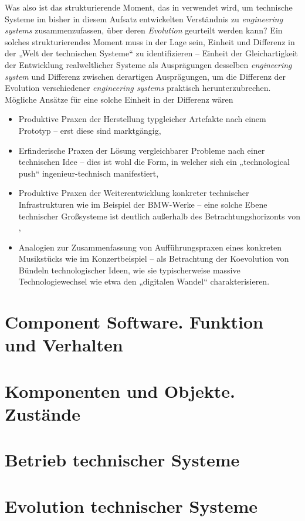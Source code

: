 \documentclass[11pt,a4paper]{article}
\begin{document}
Was also ist das strukturierende Moment, das in \cite{TESE2018} verwendet
wird, um technische Systeme im bisher in diesem Aufsatz entwickelten
Verständnis zu \emph{engineering systems} zusammenzufassen, über deren
\emph{Evolution} geurteilt werden kann? Ein solches strukturierendes Moment
muss in der Lage sein, Einheit und Differenz in der „Welt der technischen
Systeme“ zu identifizieren -- Einheit der Gleichartigkeit der Entwicklung
realweltlicher Systeme als Ausprägungen desselben \emph{engineering system}
und Differenz zwischen derartigen Ausprägungen, um die Differenz der Evolution
verschiedener \emph{engineering systems} praktisch herunterzubrechen.
Mögliche Ansätze für eine solche Einheit in der Differenz wären
\begin{itemize}
\item Produktive Praxen der Herstellung typgleicher Artefakte nach einem
  Prototyp -- erst diese sind marktgängig,
\item Erfinderische Praxen der Lösung vergleichbarer Probleme nach einer
  technischen Idee -- dies ist wohl die Form, in welcher sich ein
  „technological push“ ingenieur-technisch manifestiert,
\item Produktive Praxen der Weiterentwicklung konkreter technischer
  Infrastrukturen wie im Beispiel der BMW-Werke -- eine solche Ebene
  technischer Großsysteme ist deutlich außerhalb des Betrachtungshorizonts von
  \cite{TESE2018}, 
\item Analogien zur Zusammenfassung von Aufführungspraxen eines konkreten
  Musikstücks wie im Konzertbeispiel -- als Betrachtung der Koevolution von
  Bündeln technologischer Ideen, wie sie typischerweise massive
  Technologiewechsel wie etwa den „digitalen Wandel“ charakterisieren. 
\end{itemize}


\section{Component Software. Funktion und Verhalten}
\section{Komponenten und Objekte. Zustände}
\section{Betrieb technischer Systeme}
\section{Evolution technischer Systeme}
\end{document}

